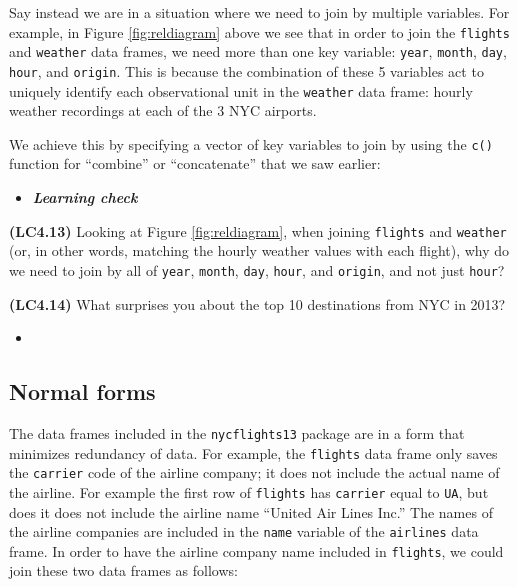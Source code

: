 \documentclass[12pt, krantz2,]{krantz}
\makeatletter
\newenvironment{Shaded}{\begin{snugshade}}{\end{snugshade}}
\newcommand{\DataTypeTok}[1]{\textcolor[rgb]{0.27,0.27,0.27}{#1}}
\newcommand{\KeywordTok}[1]{\textcolor[rgb]{0.27,0.27,0.27}{\textbf{#1}}}
\newcommand{\NormalTok}[1]{#1}
\newcommand{\OperatorTok}[1]{\textcolor[rgb]{0.43,0.43,0.43}{\textbf{#1}}}
\newcommand{\StringTok}[1]{\textcolor[rgb]{0.5,0.5,0.5}{#1}}
\newenvironment{kframe}{%
\medskip{}
\setlength{\fboxsep}{.8em}
 \def\at@end@of@kframe{}%
 \ifinner\ifhmode%
  \def\at@end@of@kframe{\end{minipage}}%
  \begin{minipage}{\columnwidth}%
 \fi\fi%
 \def\FrameCommand##1{\hskip\@totalleftmargin \hskip-\fboxsep
 \colorbox{shadecolor}{##1}\hskip-\fboxsep
     \hskip-\linewidth \hskip-\@totalleftmargin \hskip\columnwidth}%
 \MakeFramed {\advance\hsize-\width
   \@totalleftmargin\z@ \linewidth\hsize
   \@setminipage}}%
 {\par\unskip\endMakeFramed%
 \at@end@of@kframe}
\renewenvironment{Shaded}{\begin{kframe}}{\end{kframe}}
\newenvironment{rmdblock}[1]
  {\begin{shaded*}
  \begin{itemize}
  \renewcommand{\labelitemi}{
    \raisebox{-.7\height}[0pt][0pt]{
    }
  }
  \item
  }
  {
  \end{itemize}
  \end{shaded*}
  }
\newenvironment{learncheck}
  {\begin{rmdblock}{warning}}
  {\end{rmdblock}}
\makeatother
\begin{document}
Say instead we are in a situation where we need to join by multiple variables. For example, in Figure \ref{fig:reldiagram} above we see that in order to join the \texttt{flights} and \texttt{weather} data frames, we need more than one key variable: \texttt{year}, \texttt{month}, \texttt{day}, \texttt{hour}, and \texttt{origin}. This is because the combination of these 5 variables act to uniquely identify each observational unit in the \texttt{weather} data frame: hourly weather recordings at each of the 3 NYC airports.

We achieve this by specifying a vector of key variables to join by using the \texttt{c()} function for ``combine'' or ``concatenate'' that we saw earlier:

\begin{Shaded}
\end{Shaded}

\begin{learncheck}
\textbf{\emph{Learning check}}
\end{learncheck}

\textbf{(LC4.13)} Looking at Figure \ref{fig:reldiagram}, when joining \texttt{flights} and \texttt{weather} (or, in other words, matching the hourly weather values with each flight), why do we need to join by all of \texttt{year}, \texttt{month}, \texttt{day}, \texttt{hour}, and \texttt{origin}, and not just \texttt{hour}?

\textbf{(LC4.14)} What surprises you about the top 10 destinations from NYC in 2013?

\begin{learncheck}

\end{learncheck}

\hypertarget{normal-forms}{%
\subsection{Normal forms}\label{normal-forms}}

The data frames included in the \texttt{nycflights13} package are in a form that minimizes redundancy of data. For example, the \texttt{flights} data frame only saves the \texttt{carrier} code of the airline company; it does not include the actual name of the airline. For example the first row of \texttt{flights} has \texttt{carrier} equal to \texttt{UA}, but does it does not include the airline name ``United Air Lines Inc.'' The names of the airline companies are included in the \texttt{name} variable of the \texttt{airlines} data frame. In order to have the airline company name included in \texttt{flights}, we could join these two data frames as follows:
\end{document}
